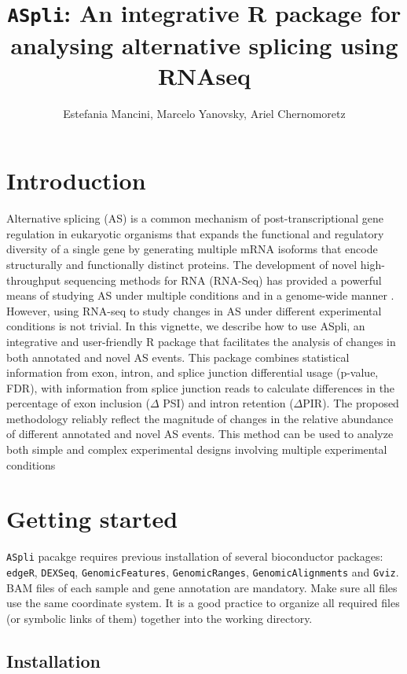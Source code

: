 \documentclass{article}
\title{\texttt{ASpli}: An integrative R package for analysing alternative splicing using RNAseq}
\author{Estefania Mancini, Marcelo Yanovsky, Ariel Chernomoretz}
\begin{document}

\maketitle
\tableofcontents
\section{Introduction}
Alternative splicing (AS) is a common mechanism of post-transcriptional gene regulation in eukaryotic organisms that expands the functional and regulatory diversity of a single gene by generating multiple mRNA isoforms that encode structurally and functionally distinct proteins. The development of novel high-throughput sequencing methods for RNA (RNA-Seq) has provided a powerful means of studying AS under multiple conditions and in a genome-wide manner \cite{pmid24549677}. However, using RNA-seq to study changes in AS under different experimental conditions is not trivial. 
In this vignette, we describe how to use ASpli, an integrative and user-friendly R package that facilitates the analysis of changes in both annotated and novel AS events. This package combines statistical information from exon, intron, and splice junction differential usage (p-value, FDR), with information from splice junction reads to calculate differences in the percentage of exon inclusion ($\Delta$  PSI) and intron retention ($\Delta$PIR). The proposed methodology reliably reflect the magnitude of changes in the relative abundance of different annotated and novel AS events. This method can be used to analyze both simple and complex experimental designs involving multiple experimental conditions

\section{Getting started}

\texttt{ASpli} pacakge requires previous installation of several  bioconductor packages: \texttt{edgeR}, \texttt{DEXSeq}, \texttt{GenomicFeatures}, \texttt{GenomicRanges}, \texttt{GenomicAlignments} and  \texttt{Gviz}. \\

BAM files of each sample and gene annotation are mandatory. Make sure all files use the same coordinate system. It is a good practice to organize all required files (or symbolic links of them) together into the  working directory.

\subsection{Installation}
\end{document}
